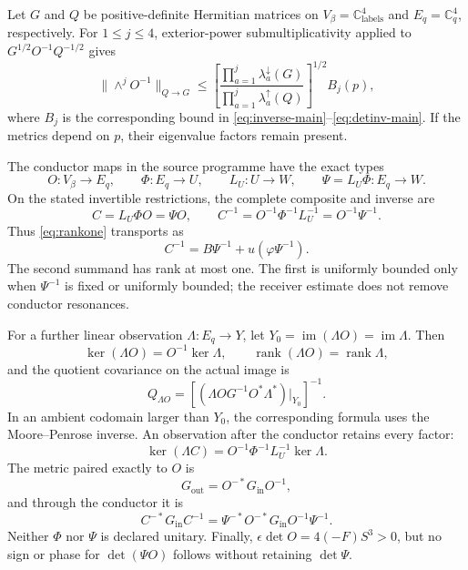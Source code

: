 Let \(G\) and \(Q\) be positive-definite Hermitian matrices on
\(V_\beta=\mathbb C^4_{\mathrm{labels}}\) and
\(E_q=\mathbb C^4_q\), respectively. For \(1\le j\le4\), exterior-power
submultiplicativity applied to
\(G^{1/2}O^{-1}Q^{-1/2}\) gives
\begin{equation}\label{eq:metric-wedge}
 \|\wedge^jO^{-1}\|_{Q\to G}
 \le
 \left[
 \frac{\prod_{a=1}^j\lambda_a^\downarrow(G)}
 {\prod_{a=1}^j\lambda_a^\uparrow(Q)}
 \right]^{1/2}B_j(p),
\end{equation}
where \(B_j\) is the corresponding bound in
\eqref{eq:inverse-main}--\eqref{eq:detinv-main}. If the metrics depend on
\(p\), their eigenvalue factors remain present.

The conductor maps in the source programme have the exact types
\[
 O:V_\beta\to E_q,\qquad
 \Phi:E_q\to U,\qquad
 L_U:U\to W,\qquad
 \Psi=L_U\Phi:E_q\to W.
\]
On the stated invertible restrictions, the complete composite and inverse are
\begin{equation}\label{eq:conductor-composite}
 C=L_U\Phi O=\Psi O,
 \qquad
 C^{-1}=O^{-1}\Phi^{-1}L_U^{-1}=O^{-1}\Psi^{-1}.
\end{equation}
Thus \eqref{eq:rankone} transports as
\begin{equation}\label{eq:rankone-transport}
 C^{-1}=B\Psi^{-1}+u(\varphi\Psi^{-1}).
\end{equation}
The second summand has rank at most one. The first is uniformly bounded only
when \(\Psi^{-1}\) is fixed or uniformly bounded; the receiver estimate does
not remove conductor resonances.

For a further linear observation \(\Lambda:E_q\to Y\), let
\(Y_0=\operatorname{im}(\Lambda O)=\operatorname{im}\Lambda\). Then
\begin{equation}\label{eq:observation}
 \ker(\Lambda O)=O^{-1}\ker\Lambda,
 \qquad
 \operatorname{rank}(\Lambda O)=\operatorname{rank}\Lambda,
\end{equation}
and the quotient covariance on the actual image is
\begin{equation}\label{eq:covariance}
 Q_{\Lambda O}
 =\left[(\Lambda OG^{-1}O^*\Lambda^*)|_{Y_0}\right]^{-1}.
\end{equation}
In an ambient codomain larger than \(Y_0\), the corresponding formula uses
the Moore--Penrose inverse. An observation after the conductor retains every
factor:
\[
 \ker(\Lambda C)=O^{-1}\Phi^{-1}L_U^{-1}\ker\Lambda.
\]
The metric paired exactly to \(O\) is
\[
 G_{\mathrm{out}}=O^{-*}G_{\mathrm{in}}O^{-1},
\]
and through the conductor it is
\[
 C^{-*}G_{\mathrm{in}}C^{-1}
 =\Psi^{-*}O^{-*}G_{\mathrm{in}}O^{-1}\Psi^{-1}.
\]
Neither \(\Phi\) nor \(\Psi\) is declared unitary. Finally,
\(\epsilon\det O=4(-F)S^3>0\), but no sign or phase for
\(\det(\Psi O)\) follows without retaining \(\det\Psi\).

